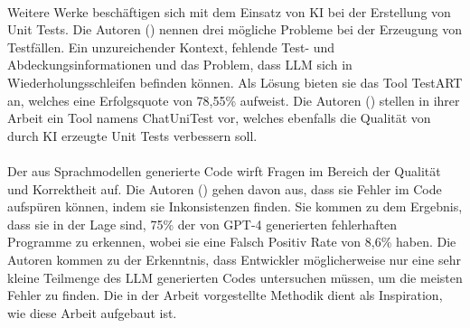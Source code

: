 \documentclass[12pt,toc=bib,toc=listof]{scrreprt}
\begin{document}
\\
Weitere Werke beschäftigen sich mit dem Einsatz von KI bei der Erstellung von Unit Tests. Die Autoren (\cite{Gu2024}) nennen drei mögliche Probleme bei der Erzeugung von Testfällen. 
Ein unzureichender Kontext, fehlende Test- und Abdeckungsinformationen und das Problem, dass LLM sich in Wiederholungsschleifen befinden können. Als Lösung bieten sie das Tool TestART an, welches eine Erfolgsquote von 78,55\% aufweist. Die Autoren (\cite{Chen2024}) stellen in ihrer Arbeit ein Tool namens ChatUniTest vor, welches ebenfalls die Qualität von durch KI erzeugte Unit Tests verbessern soll.\\
\\
Der aus Sprachmodellen generierte Code wirft Fragen im Bereich der Qualität und Korrektheit auf. Die Autoren (\cite{Wang2024}) gehen davon aus, dass sie Fehler im Code aufspüren können, indem sie Inkonsistenzen finden. Sie kommen zu dem Ergebnis, dass sie in der Lage sind, 75\% der von GPT-4 generierten fehlerhaften Programme zu erkennen, wobei sie eine Falsch Positiv Rate von 8,6\% haben. Die Autoren kommen zu der Erkenntnis, dass Entwickler möglicherweise nur eine sehr kleine Teilmenge des LLM generierten Codes untersuchen müssen, um die meisten Fehler zu finden. Die in der Arbeit vorgestellte Methodik dient als Inspiration, wie diese Arbeit aufgebaut ist.

\end{document}

